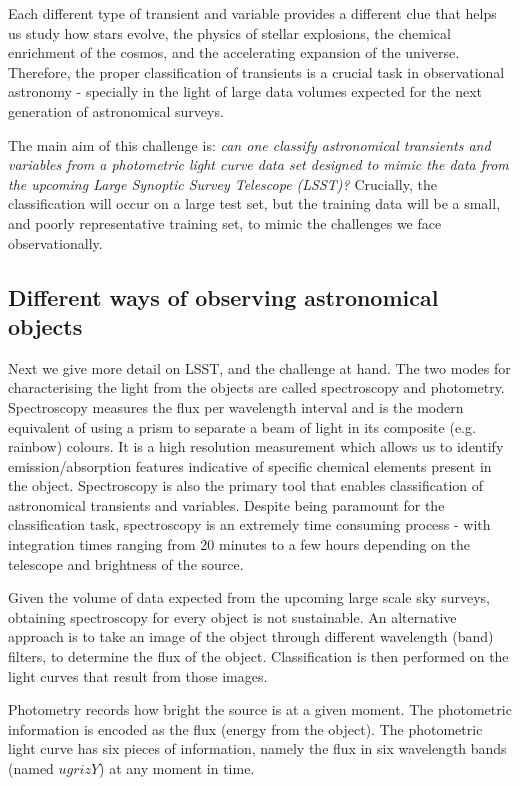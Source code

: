 \documentclass[\docopts]{\docclass}
\begin{document}
Each different type of transient and variable provides a different clue that helps us study how stars evolve, the physics of stellar explosions, the chemical enrichment of the cosmos, and the accelerating expansion of the universe.  Therefore, the proper classification of transients is a crucial task in observational astronomy - specially in the light of large data volumes expected for the next generation of astronomical surveys.

The main aim of this challenge is: \textit{can one classify astronomical transients and variables from a photometric light curve data set designed to mimic the data from the upcoming Large Synoptic Survey Telescope (LSST)?} Crucially, the classification will occur on a large test set, but the training data will be a small, and poorly representative training set, to mimic the challenges we face observationally.

\subsection{Different ways of observing astronomical objects}
Next we give more detail on LSST, and the challenge at hand. The two modes for characterising the light from the objects are called spectroscopy and photometry.
Spectroscopy measures the flux per wavelength interval and is the modern equivalent of using a prism to separate a beam of light in its composite (e.g. rainbow) colours. It is a high resolution measurement which allows us to identify emission/absorption features indicative of specific chemical elements present in the object.  Spectroscopy is also the primary tool that enables classification of astronomical transients and variables. Despite being paramount for the classification task, spectroscopy is an extremely time consuming process - with integration times ranging from 20 minutes to a few hours depending on the telescope and brightness of the source.

Given the volume of data expected from the upcoming large scale sky surveys, obtaining spectroscopy for every object is not sustainable. An alternative approach is to take an image of the object through different wavelength (band) filters, to determine the flux of the object. Classification is then performed on the light curves that result from those images.

Photometry records how bright the source is at a given moment. The photometric information is encoded as the flux (energy from the object). The photometric light curve has six pieces of information, namely the flux in six wavelength bands (named $ugrizY$) at any moment in time.
\end{document}
